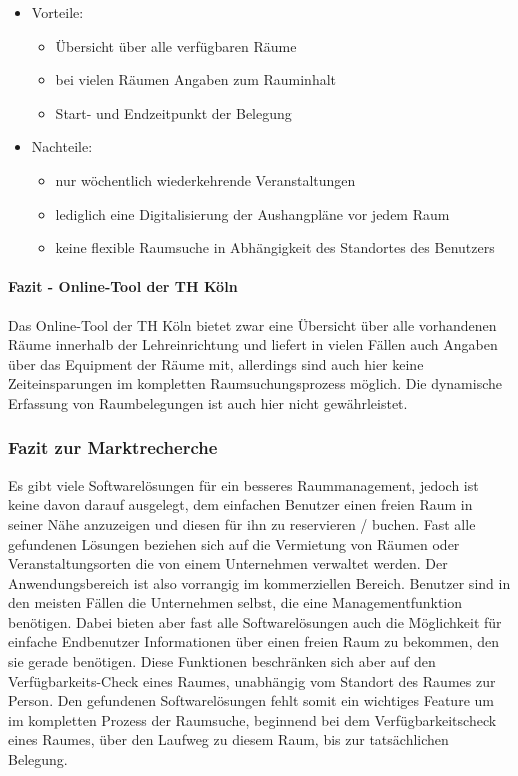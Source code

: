 \begin{itemize}
	\item Vorteile:
		\begin{itemize}
			\item Übersicht über alle verfügbaren Räume
			\item bei vielen Räumen Angaben zum Rauminhalt
			\item Start- und Endzeitpunkt der Belegung
		\end{itemize}
	\item Nachteile:
		\begin{itemize}
			\item nur wöchentlich wiederkehrende Veranstaltungen
			\item lediglich eine Digitalisierung der Aushangpläne vor jedem Raum
			\item keine flexible Raumsuche in Abhängigkeit des Standortes des Benutzers
		\end{itemize}
\end{itemize}

\paragraph{Fazit - Online-Tool der TH Köln}
\label{sec:Fazit_Online-Tool der TH Köln}

Das Online-Tool der TH Köln bietet zwar eine Übersicht über alle vorhandenen
Räume innerhalb der Lehreinrichtung und liefert in vielen Fällen auch Angaben
über das Equipment der Räume mit, allerdings sind auch hier keine
Zeiteinsparungen im kompletten Raumsuchungsprozess möglich. Die dynamische
Erfassung von Raumbelegungen ist auch hier nicht gewährleistet.


\subsubsection{Fazit zur Marktrecherche}
\label{sec:Fazit_zur Marktrecherche}

Es gibt viele Softwarelösungen für ein besseres Raummanagement, jedoch ist
keine davon darauf ausgelegt, dem einfachen Benutzer einen freien Raum in
seiner Nähe anzuzeigen und diesen für ihn zu reservieren / buchen. Fast alle
gefundenen Lösungen beziehen sich auf die Vermietung von Räumen oder
Veranstaltungsorten die von einem Unternehmen verwaltet werden.
Der Anwendungsbereich ist also vorrangig im kommerziellen Bereich. Benutzer
sind in den meisten Fällen die Unternehmen selbst, die eine Managementfunktion
benötigen. Dabei bieten aber fast alle Softwarelösungen auch die Möglichkeit
für einfache Endbenutzer Informationen über einen freien Raum zu bekommen,
den sie gerade benötigen. Diese Funktionen beschränken sich aber auf den
Verfügbarkeits-Check eines Raumes, unabhängig vom Standort des Raumes zur
Person. Den gefundenen Softwarelösungen fehlt somit ein wichtiges Feature um im
kompletten Prozess der Raumsuche, beginnend bei dem Verfügbarkeitscheck eines
Raumes, über den Laufweg zu diesem Raum, bis zur tatsächlichen Belegung.


